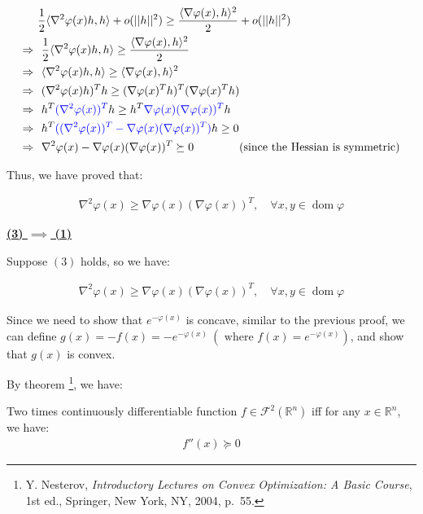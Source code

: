 \documentclass{article}
\DeclareMathOperator{\domain}{dom}
\begin{document}
\begin{align*}
    &\frac{1}{2} \langle\nabla^2 \varphi(x) h, h \rangle + o(||h||^2)  \geq \frac{\langle \nabla \varphi(x), h \rangle^2}{2} + o(||h||^2) \\
    \Rightarrow \ & \ \frac{1}{2} \langle\nabla^2 \varphi(x) h, h \rangle  \geq \frac{\langle \nabla \varphi(x), h \rangle^2}{2} \\
    \Rightarrow \ & \ \langle\nabla^2 \varphi(x) h, h \rangle  \geq \langle \nabla \varphi(x), h \rangle^2 \\
    \Rightarrow \ & \ (\nabla^2 \varphi(x) h)^T h \geq (\nabla \varphi(x)^T h)^T (\nabla \varphi(x)^T h) \\
    \Rightarrow \ & \ h^T \textcolor{blue}{(\nabla^2 \varphi(x))^T} h \geq h^T \textcolor{blue}{\nabla \varphi(x) (\nabla \varphi(x))^T} h \\
    \Rightarrow \ & \ h^T \textcolor{blue}{((\nabla^2 \varphi(x))^T - \nabla \varphi(x) (\nabla \varphi(x))^T)} h \geq 0 \\
    \Rightarrow \ & \ \nabla^2 \varphi(x) - \nabla \varphi(x) (\nabla \varphi(x))^T \succeq 0 \qquad \qquad \text{(since the Hessian is symmetric)}
\end{align*}

Thus, we have proved that:

\begin{align*}
    \nabla^2 \varphi(x) \geq \nabla \varphi(x) (\nabla \varphi(x))^T, \quad \forall x,y \in \domain \varphi
\end{align*}

\textbf{\underline{(3) $\implies$ (1)}}
\bigskip

Suppose $(3)$ holds, so we have:

\begin{align*}
    \nabla^2 \varphi(x) \geq \nabla \varphi(x) (\nabla \varphi(x))^T, \quad \forall x,y \in \domain \varphi
\end{align*}

Since we need to show that $e^{-\varphi(x)}$ is concave, similar to the previous proof, we can define $g(x) = -f(x) = -e^{-\varphi(x)} \ (\text{ where } f(x) = e^{-\varphi(x)})$,
and show that $g(x)$ is convex.
\bigskip

By theorem
\footnote{Y. Nesterov, \textit{Introductory Lectures on Convex Optimization: A Basic Course}, 1st ed., Springer, New York, NY, 2004, p.~55.}, 
we have:
\begin{tcolorbox}[greenbox, title = Theorem 2.1.4]
    Two times continuously differentiable function $f \in \mathcal{F}^2(\mathbb{R}^n)$ iff for any $x \in \mathbb{R}^n$, we have:
    \begin{align*}
        f''(x) \succeq 0
    \end{align*}
\end{tcolorbox}
\end{document}
